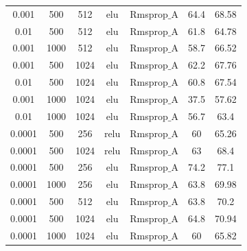 \documentclass[12pt]{report}
\begin{document}
\begin{table}[H]
\begin{center}
\begin{tabular}{| c | c | c | c | c | c | c |}
            0.001 & 500 & 512 & elu & Rmsprop$\_$A & 64.4 & 68.58\\
            0.01 & 500 & 512 & elu & Rmsprop$\_$A & 61.8 & 64.78\\
            0.001 & 1000 & 512 & elu & Rmsprop$\_$A & 58.7 & 66.52\\
            0.001 & 500 & 1024 & elu & Rmsprop$\_$A & 62.2 & 67.76\\
            0.01 & 500 & 1024 & elu & Rmsprop$\_$A & 60.8 & 67.54\\
            0.001 & 1000 & 1024 & elu & Rmsprop$\_$A & 37.5 & 57.62\\
            0.01 & 1000 & 1024 & elu & Rmsprop$\_$A & 56.7 & 63.4\\
			\hline
            0.0001 & 500 & 256 & relu & Rmsprop$\_$A & 60 & 65.26\\
            0.0001 & 500 & 1024 & relu & Rmsprop$\_$A & 63 & 68.4\\
            0.0001 & 500 & 256 & elu & Rmsprop$\_$A & 74.2 & 77.1\\
            0.0001 & 1000 & 256 & elu & Rmsprop$\_$A & 63.8 & 69.98\\
            0.0001 & 500 & 512 & elu & Rmsprop$\_$A & 63.8 & 70.2\\
            0.0001 & 500 & 1024 & elu & Rmsprop$\_$A & 64.8 & 70.94\\
            0.0001 & 1000 & 1024 & elu & Rmsprop$\_$A & 60 & 65.82\\
			\hline
		\end{tabular}
	\end{center}
\end{table}
\end{document}
